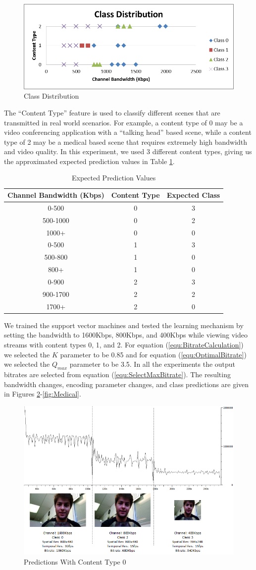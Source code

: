 \documentclass[a4paper,12pt]{article}
\begin{document}
\begin{figure}[h]
\centering
\includegraphics[width=0.5\linewidth]{ClassDistribution.png}
\caption{Class Distribution}
\label{fig:ClassDistribution}
\end{figure}
The ``Content Type'' feature is used to classify different scenes that are transmitted in real world scenarios. For example, a content type of 0 may be a video conferencing application with a ``talking head'' based scene, while a content type of 2 may be a medical based scene that requires extremely high bandwidth and video quality. In this experiment, we used 3 different content types, giving us the approximated expected prediction values in Table \ref{tab:ExpectedValues}.
\begin{table}
\caption{Expected Prediction Values}
\label{tab:ExpectedValues}
\begin{tabular}{c|c|c}
\textbf{Channel Bandwidth (Kbps)}&\textbf{Content Type}&\textbf{Expected Class}\\
\hline
0-500&0&3\\
500-1000&0&2\\
1000+&0&0\\
0-500&1&3\\
500-800&1&0\\
800+&1&0\\
0-900&2&3\\
900-1700&2&2\\
1700+&2&0
\end{tabular}
\end{table}
We trained the support vector machines and tested the learning mechanism by setting the bandwidth to 1600Kbps, 800Kbps, and 400Kbps while viewing video streams with content types 0, 1, and 2. For equation (\ref{equ:BitrateCalculation}) we selected the $K$ parameter to be 0.85 and for equation (\ref{equ:OptimalBitrate}) we selected the $Q_{max}$ parameter to be 3.5. In all the experiments the output bitrates are selected from equation (\ref{equ:SelectMaxBitrate}). The resulting bandwidth changes, encoding parameter changes, and class predictions are given in Figures \ref{fig:TalkingHead}-\ref{fig:Medical}.
\begin{figure}[h]
\centering
\includegraphics[width=0.5\linewidth]{TrainingExperimentTalkingHead.png}
\caption{Predictions With Content Type 0}
\label{fig:TalkingHead}
\end{figure}
\end{document}
